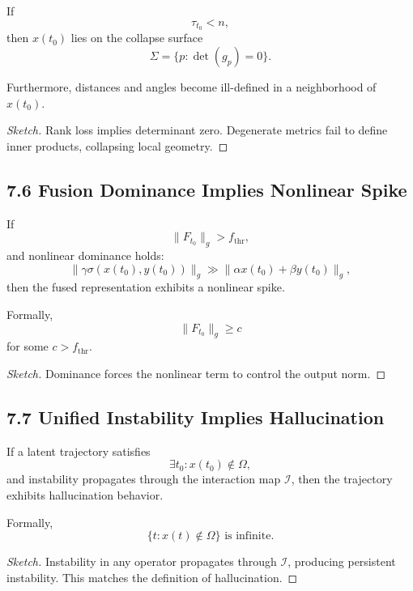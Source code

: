 \begin{theorem}
If
\[
\tau_{t_0} < n,
\]
then $x(t_0)$ lies on the collapse surface
\[
\Sigma = \{ p : \det(g_p) = 0 \}.
\]

Furthermore, distances and angles become ill-defined in a neighborhood of
$x(t_0)$.
\end{theorem}

\begin{proof}[Sketch]
Rank loss implies determinant zero. Degenerate metrics fail to define
inner products, collapsing local geometry.
\end{proof}

\subsection*{7.6 Fusion Dominance Implies Nonlinear Spike}

\begin{theorem}
If
\[
\|F_{t_0}\|_g > f_{\mathrm{thr}},
\]
and nonlinear dominance holds:
\[
\|\gamma \sigma(x(t_0), y(t_0))\|_g
\gg
\|\alpha x(t_0) + \beta y(t_0)\|_g,
\]
then the fused representation exhibits a nonlinear spike.

Formally,
\[
\|F_{t_0}\|_g \ge c
\]
for some $c > f_{\mathrm{thr}}$.
\end{theorem}

\begin{proof}[Sketch]
Dominance forces the nonlinear term to control the output norm.
\end{proof}

\subsection*{7.7 Unified Instability Implies Hallucination}

\begin{theorem}
If a latent trajectory satisfies
\[
\exists t_0 : x(t_0) \notin \Omega,
\]
and instability propagates through the interaction map $\mathcal{I}$,
then the trajectory exhibits hallucination behavior.

Formally,
\[
\{ t : x(t) \notin \Omega \} \text{ is infinite}.
\]
\end{theorem}

\begin{proof}[Sketch]
Instability in any operator propagates through $\mathcal{I}$, producing
persistent instability. This matches the definition of hallucination.
\end{proof}

